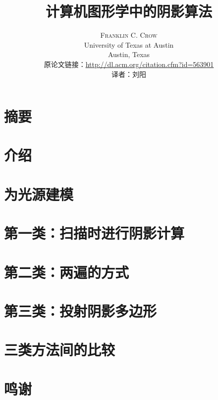 \documentclass[a4paper, twocolumn]{article}
\title{计算机图形学中的阴影算法} %
\author{%
	\textsc{Franklin C. Crow} \\[1ex] %
	\normalsize University of Texas at Austin \\ %
	\normalsize Austin, Texas \\ %
	\normalsize 原论文链接：\href{http://dl.acm.org/citation.cfm?id=563901}{http://dl.acm.org/citation.cfm?id=563901} \\
	\normalsize 译者：刘阳
}
\date{} %
\begin{document}
\begin{CJK}{UTF8}{gbsn}
	\maketitle
	
	
	\section{摘要}
	
	\section{介绍}
	
	\section{为光源建模}
	
	\section{第一类：扫描时进行阴影计算}
	
	\section{第二类：两遍的方式}
	
	\section{第三类：投射阴影多边形}
	
	\section{三类方法间的比较}
	
	\section{鸣谢}
	
	\renewcommand{\refname}{参考文献}
	\begin{thebibliography}{99} %
		

\end{thebibliography}
\end{CJK}
\end{document}
